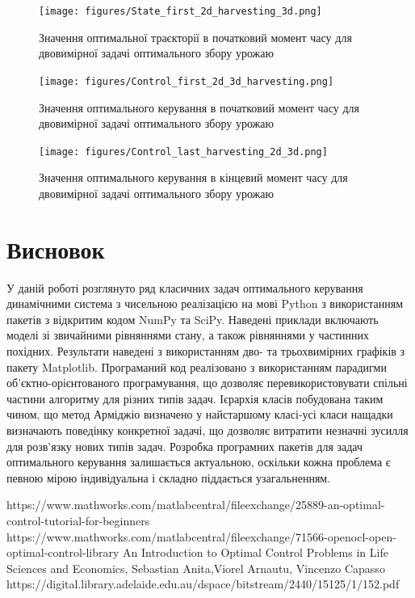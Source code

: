 \documentclass[a4paper,12pt]{extreport}
\begin{document}
\begin{figure}[H]
\centering
\texttt{[image: figures/State\_first\_2d\_harvesting\_3d.png]}
\caption{Значення оптимальної траєкторії в початковий момент часу для двовимірної задачі оптимального збору урожаю}
\label{im:4.2}
\end{figure}
\begin{figure}[H]
\centering
\texttt{[image: figures/Control\_first\_2d\_3d\_harvesting.png]}
\caption{Значення оптимального керування в початковий момент часу для двовимірної задачі оптимального збору урожаю}
\label{im:4.3}
\end{figure}
\begin{figure}[H]
\centering
\texttt{[image: figures/Control\_last\_harvesting\_2d\_3d.png]}
\caption{Значення оптимального керування в кінцевий момент часу для двовимірної задачі оптимального збору урожаю}
\label{im:4.4}
\end{figure}
\chapter{Висновок} 
У даній роботі розглянуто ряд класичних задач оптимального керування динамічними система з чисельною
реалізацією на мові Python з використанням пакетів з відкритим кодом NumPy та SciPy. Наведені приклади включають моделі 
зі звичайними рівняннями стану, а також рівняннями у частинних похідних. Результати наведені з використанням дво- та трьохвимірних
графіків з пакету Matplotlib. Програманий код реалізовано з використанням парадигми об'єктно-орієнтованого програмування, що
дозволяє перевикористовувати спільні частини алгоритму для різних типів задач. Ієрархія класів побудована таким чином, що 
метод Арміджіо визначено у найстаршому класі-усі класи нащадки визначають поведінку конкретної задачі, що дозволяє витратити
незначні зусилля для розв'язку нових типів задач. 
Розробка програмних пакетів для задач оптимального керування залишається актуальною, оскільки кожна проблема є певною мірою індивідуальна 
і складно піддається узагальненням. 

\newpage
{}
\begin{thebibliography}{9}
     https://www.mathworks.com/matlabcentral/fileexchange/25889-an-optimal-control-tutorial-for-beginners
   https://www.mathworks.com/matlabcentral/fileexchange/71566-openocl-open-optimal-control-library
 An Introduction to Optimal Control Problems in Life Sciences and Economics, Sebastian Anita,Viorel Arnautu, Vincenzo Capasso
 https://digital.library.adelaide.edu.au/dspace/bitstream/2440/15125/1/152.pdf
\end{thebibliography}
 
\end{document}
